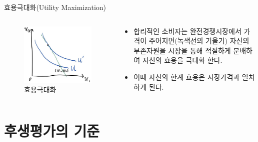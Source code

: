 \documentclass[aspectratio=169,xcolor=dvipsnames,handout]{beamer}
\begin{document}
\begin{frame}{효용극대화(Utility Maximization)}
\begin{columns}
    \begin{column}{.5\textwidth}
        \begin{figure}
            \centering
            \includegraphics[scale=.3]{pic/umax.jpg}
            \caption{효용극대화}
        \end{figure}
    \end{column}    
    \begin{column}{.5\textwidth}
        \begin{itemize}
            \item 합리적인 소비자는 완전경쟁시장에서 가격이 주어지면(녹색선의 기울기) 자신의 부존자원을 시장을 통해 적절하게 분배하여 자신의 효용을 극대화 한다. 
            \item 이때 자신의 한계 효용은 시장가격과 일치하게 된다.
        \end{itemize}
    \end{column}    
\end{columns}
\end{frame}

\section{후생평가의 기준}
\end{document}
